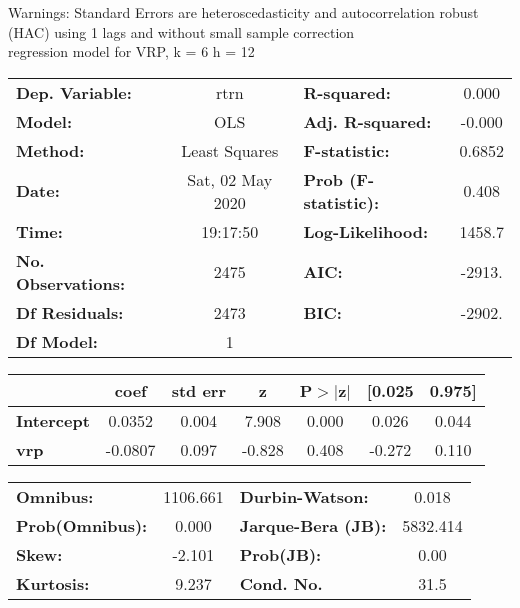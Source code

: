 Warnings: \newline
 [1] Standard Errors are heteroscedasticity and autocorrelation robust (HAC) using 1 lags and without small sample correction\\ 

regression model for VRP, k = 6 h = 12\begin{center}
\begin{tabular}{lclc}
\toprule
\textbf{Dep. Variable:}    &       rtrn       & \textbf{  R-squared:         } &     0.000   \\
\textbf{Model:}            &       OLS        & \textbf{  Adj. R-squared:    } &    -0.000   \\
\textbf{Method:}           &  Least Squares   & \textbf{  F-statistic:       } &    0.6852   \\
\textbf{Date:}             & Sat, 02 May 2020 & \textbf{  Prob (F-statistic):} &    0.408    \\
\textbf{Time:}             &     19:17:50     & \textbf{  Log-Likelihood:    } &    1458.7   \\
\textbf{No. Observations:} &        2475      & \textbf{  AIC:               } &    -2913.   \\
\textbf{Df Residuals:}     &        2473      & \textbf{  BIC:               } &    -2902.   \\
\textbf{Df Model:}         &           1      & \textbf{                     } &             \\
\bottomrule
\end{tabular}
\begin{tabular}{lcccccc}
                   & \textbf{coef} & \textbf{std err} & \textbf{z} & \textbf{P$> |$z$|$} & \textbf{[0.025} & \textbf{0.975]}  \\
\midrule
\textbf{Intercept} &       0.0352  &        0.004     &     7.908  &         0.000        &        0.026    &        0.044     \\
\textbf{vrp}       &      -0.0807  &        0.097     &    -0.828  &         0.408        &       -0.272    &        0.110     \\
\bottomrule
\end{tabular}
\begin{tabular}{lclc}
\textbf{Omnibus:}       & 1106.661 & \textbf{  Durbin-Watson:     } &    0.018  \\
\textbf{Prob(Omnibus):} &   0.000  & \textbf{  Jarque-Bera (JB):  } & 5832.414  \\
\textbf{Skew:}          &  -2.101  & \textbf{  Prob(JB):          } &     0.00  \\
\textbf{Kurtosis:}      &   9.237  & \textbf{  Cond. No.          } &     31.5  \\
\bottomrule
\end{tabular}
\end{center}

